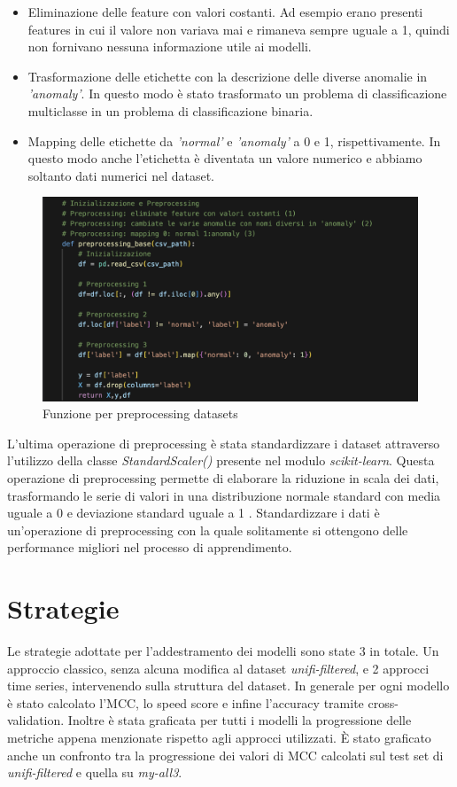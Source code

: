 \begin{itemize}
    \item Eliminazione delle feature con valori costanti. Ad esempio erano presenti features in cui il valore non variava mai e rimaneva sempre uguale a 1, quindi non fornivano nessuna informazione utile ai modelli.
    \item Trasformazione delle etichette con la descrizione delle diverse anomalie in \textit{'anomaly'}. In questo modo \`e stato trasformato un problema di classificazione multiclasse in un problema di classificazione binaria.
    \item Mapping delle etichette da \textit{'normal'} e \textit{'anomaly'} a 0 e 1, rispettivamente. In questo modo anche l'etichetta \`e diventata un valore numerico e abbiamo soltanto dati numerici nel dataset.
\end{itemize}

\begin{figure}[H]
    \centering
    \includegraphics[width=0.9\linewidth]{preprocessing.png}
    \caption{Funzione per preprocessing datasets}
    \label{fig:enter-label}
\end{figure}

L'ultima operazione di preprocessing \`e stata standardizzare i dataset attraverso l'utilizzo della classe \textit{StandardScaler()} presente nel modulo \textit{scikit-learn}. Questa operazione di preprocessing permette di elaborare la riduzione in scala dei dati, trasformando le serie di valori in una distribuzione normale standard con media uguale a 0 e deviazione standard uguale a 1 \cite{stdscaler}. Standardizzare i dati \`e un'operazione di preprocessing con la quale solitamente si ottengono delle performance migliori nel processo di apprendimento.

\section{Strategie}
Le strategie adottate per l'addestramento dei modelli sono state 3 in totale. Un approccio classico, senza alcuna modifica al dataset \textit{unifi-filtered}, e 2 approcci time series, intervenendo sulla struttura del dataset. In generale per ogni modello \`e stato calcolato l'MCC, lo speed score e infine l'accuracy tramite cross-validation. Inoltre \`e stata graficata per tutti i modelli la progressione delle metriche appena menzionate rispetto agli approcci utilizzati. \`E stato graficato anche un confronto tra la progressione dei valori di MCC calcolati sul test set di \textit{unifi-filtered} e quella su \textit{my-all3}.

